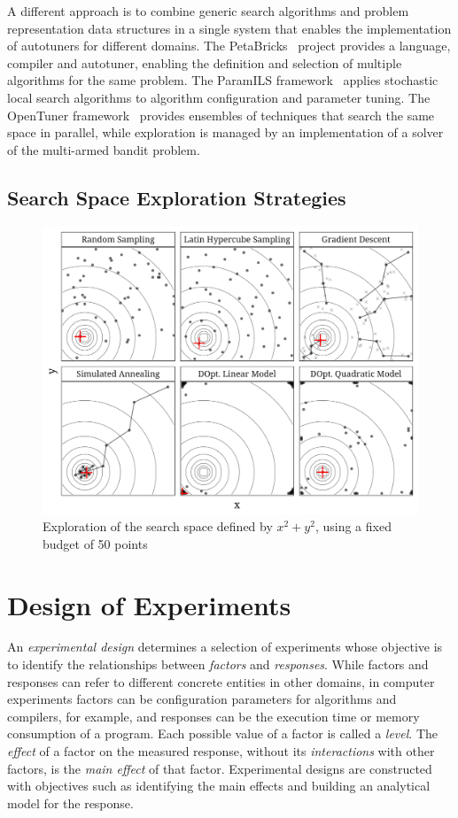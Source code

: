 \documentclass[conference]{IEEEtran}
\begin{document}
A different approach is to combine generic search algorithms and problem
representation data structures in a single system that enables the
implementation of autotuners for different domains. The
PetaBricks~\cite{ansel2009petabricks} project provides a language,
compiler and autotuner, enabling the definition and selection of multiple
algorithms for the same problem. The ParamILS
framework~\cite{hutter2009paramils} applies stochastic local search
algorithms to algorithm configuration and parameter tuning. The OpenTuner
framework~\cite{ansel2014opentuner} provides ensembles of techniques that
search the same space in parallel, while exploration is managed by an
implementation of a solver of the multi-armed bandit problem.
\subsection{Search Space Exploration Strategies}
\label{sec:org60311be}
\begin{center}
\begin{figure}[htbp]
\centering
\includegraphics[width=.95\columnwidth]{./img/sampling_comparison.pdf}
\caption{Exploration of the search space defined by \(x^2 + y^2\), using a fixed budget of 50 points}
\end{figure}
\end{center}
\section{Design of Experiments}
\label{sec:orge7eaaa8}
An \emph{experimental design} determines a selection of experiments whose objective
is to identify the relationships between \emph{factors} and \emph{responses}. While
factors and responses can refer to different concrete entities in other domains,
in computer experiments factors can be configuration parameters for algorithms
and compilers, for example, and responses can be the execution time or memory
consumption of a program. Each possible value of a factor is called a \emph{level}.
The \emph{effect} of a factor on the measured response, without its \emph{interactions}
with other factors, is the \emph{main effect} of that factor. Experimental designs
are constructed with objectives such as identifying the main effects and
building an analytical model for the response.
\end{document}
